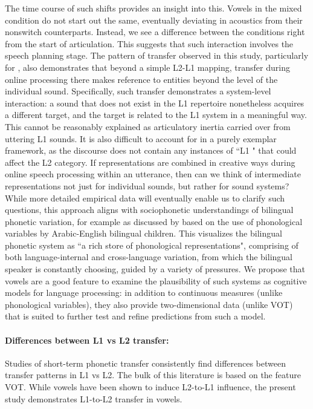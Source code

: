 \documentclass[12 pt]{article}
\newcommand{\nt}[1]{\textipa{[#1]}} %
\begin{document}
The time course of such shifts provides an insight into this. Vowels in the mixed condition do not start out the same, eventually deviating in acoustics from their nonswitch counterparts. Instead, we see a difference between the conditions right from the start of articulation. This suggests that such interaction involves the speech planning stage. The pattern of transfer observed in this study, particularly for \nt{2}, also demonstrates that beyond a simple L2-L1 mapping, transfer during online processing there makes reference to entities beyond the level of the individual sound. Specifically, such transfer demonstrates a system-level interaction: a sound that does not exist in the L1 repertoire nonetheless acquires a different target, and the target is related to the L1 system in a meaningful way. This cannot be reasonably explained as articulatory inertia carried over from uttering L1 sounds. It is also difficult to account for in a purely exemplar framework, as the discourse does not contain any instances of ``L1 \nt{2}" that could affect the L2 category. If representations are combined in creative ways during online speech processing within an utterance, then can we think of intermediate representations not just for individual sounds, but rather for sound systems? While more detailed empirical data will eventually enable us to clarify such questions, this approach aligns with sociophonetic understandings of bilingual phonetic variation, for example as discussed by \cite{khattab2009phonetic,khattab2013phonetic} based on the use of phonological variables by Arabic-English bilingual children. This visualizes the bilingual phonetic system as ``a rich store of phonological representations", comprising of both language-internal and cross-language variation, from which the bilingual speaker is constantly choosing, guided by a variety of pressures. We propose that vowels are a good feature to examine the plausibility of such systems as cognitive models for language processing: in addition to continuous measures (unlike phonological variables), they also provide two-dimensional data (unlike VOT) that is suited to further test and refine predictions from such a model.


\paragraph{Differences between L1 vs L2 transfer:}
Studies of short-term phonetic transfer consistently find differences between transfer patterns in L1 vs L2. The bulk of this literature is based on the feature VOT. While vowels have been shown to induce L2-to-L1 influence, the present study demonstrates L1-to-L2 transfer in vowels. 
\end{document}
